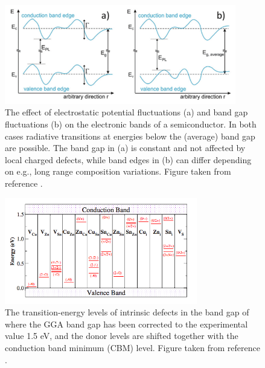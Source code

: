 \begin{figure}[h!]
  \centering
    \includegraphics[width=0.9\textwidth]{figures/band_tail_fig.png}
    \caption{The effect of electrostatic potential fluctuations (a) and band gap fluctuations (b) on the electronic bands of a semiconductor. In both cases radiative transitions at energies below the (average) band gap are possible. The band gap in (a) is constant and not affected by local charged defects, while band edges in (b) can differ depending on e.g., long range composition variations. Figure taken from reference .}
  \label{band_tail_fig}
\end{figure}



\begin{figure}[h!]
  \centering
    \includegraphics[width=0.75\textwidth]{figures/Chen_pt_E-level.png}
    \caption{The transition-energy levels of intrinsic defects in the band gap of \CZTS where the GGA band gap has been corrected to the experimental value 1.5 eV, and the donor levels are shifted together with the conduction band minimum (CBM) level. Figure taken from reference .}
  \label{Chen_pt2}
\end{figure}

